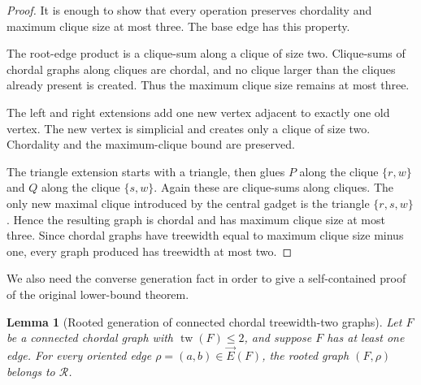 \documentclass[11pt]{article}
\newtheorem{lemma}[theorem]{Lemma}
\DeclareMathOperator{\tw}{tw}
\newcommand{\cR}{\mathcal{R}}
\newcommand{\vecE}{\overrightarrow{E}}
\begin{document}
\begin{proof}
It is enough to show that every operation preserves chordality and maximum clique size at most three.  The base edge has this property.

The root-edge product is a clique-sum along a clique of size two.  Clique-sums of chordal graphs along cliques are chordal, and no clique larger than the cliques already present is created.  Thus the maximum clique size remains at most three.

The left and right extensions add one new vertex adjacent to exactly one old vertex.  The new vertex is simplicial and creates only a clique of size two.  Chordality and the maximum-clique bound are preserved.

The triangle extension starts with a triangle, then glues $P$ along the clique $\{r,w\}$ and $Q$ along the clique $\{s,w\}$.  Again these are clique-sums along cliques.  The only new maximal clique introduced by the central gadget is the triangle $\{r,s,w\}$.  Hence the resulting graph is chordal and has maximum clique size at most three.  Since chordal graphs have treewidth equal to maximum clique size minus one, every graph produced has treewidth at most two.
\end{proof}

We also need the converse generation fact in order to give a self-contained proof of the original lower-bound theorem.

\begin{lemma}[Rooted generation of connected chordal treewidth-two graphs]
\label{lem:R-generates}
Let $F$ be a connected chordal graph with $\tw(F)\leq 2$, and suppose $F$ has at least one edge.  For every oriented edge $\rho=(a,b)\in\vecE(F)$, the rooted graph $(F,\rho)$ belongs to $\cR$.
\end{lemma}
\end{document}
